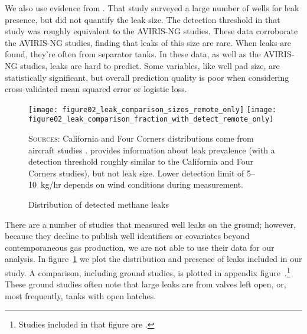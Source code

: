 We also use evidence from \textcite{Lyon/Alvarez/Zavala-Araiza/Brandt/Jackson/Hamburg:2016}.
That study surveyed a large number of wells for leak presence, but did not quantify the leak size.
The detection threshold in that study was roughly equivalent to the \gls{AVIRIS-NG} studies.
These data corroborate the \gls{AVIRIS-NG} studies, finding that leaks of this size are rare.
When leaks are found, they're often from separator tanks.
In these data, as well as the \gls{AVIRIS-NG} studies, leaks are hard to predict.
Some variables, like well pad size, are statistically significant, but overall prediction quality is poor when considering cross-validated mean squared error or logistic loss.

\begin{figure}[!bth]
\caption{Distribution of detected methane leaks}
\label{fig:leak-sizes}

\texttt{[image: figure02\_leak\_comparison\_sizes\_remote\_only]}
\texttt{[image: figure02\_leak\_comparison\_fraction\_with\_detect\_remote\_only]}

\textsc{Sources:}
California and Four Corners distributions come from aircraft studies \parencite{Duren/etal:2019, Frankenberg/etal:2016}.
\textcite{Lyon/Alvarez/Zavala-Araiza/Brandt/Jackson/Hamburg:2016}
provides information about leak prevalence (with a detection threshold roughly similar to the California and Four Corners studies), but not leak size.
Lower detection limit of 5--10~kg/hr depends on wind conditions during measurement.
\end{figure}

There are a number of studies that measured well leaks on the ground;
however, because they decline to publish well identifiers or covariates beyond contemporaneous gas production, we are not able to use their data for our analysis.
In figure~\ref{fig:leak-sizes} we plot the distribution and presence of leaks included in our study.
A comparison, including ground studies, is plotted in appendix figure~\iftoggle{usexr}{\ref{fig:app-leak-sizes}}{A5}.\footnote{%
Studies included in that figure are
\textcite{%
Robertson/Edie/Snare/Soltis/Field/Burkhart/Bell/Zimmerle/Murphy:2017,
Rella/Tsai/Botkin/Crosson/Steele:2015,
Omara/Sullivan/Li/Subramanian/Robinson/Presto:2016,
Omara/Zimmerman/Sullivan/Li/Ellis/Cesa/Subramanian/Presto/Robinson:2018,
Duren/etal:2019,
Frankenberg/etal:2016,
Lyon/Alvarez/Zavala-Araiza/Brandt/Jackson/Hamburg:2016,
}.}
These ground studies often note that large leaks are from valves left open, or, most frequently, tanks with open hatches.

